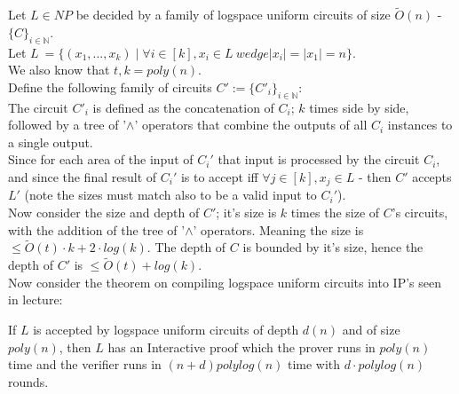 Let $L\in NP$ be decided by a family of logspace uniform circuits
of size $\tilde{O}(n)$ - $\{C\}_{i\in\mathbb{N}}$.\\
Let $L\:=\{(x_1,...,x_k)\mid \forall i\in[k], x_i\in L\ wedge |x_i|=|x_1|=n\}$.\\
We also know that $t,k=poly(n)$.\\

Define the following family of circuits $C':=\{C'_i\}_{i\in\mathbb{N}}$:\\
The circuit $C'_i$ is defined as the concatenation
of $C_i$; $k$ times side by side, followed by
a tree of '$\wedge$' operators that combine
the outputs of all $C_i$ instances to a single output.\\

Since for each area of the input of $C_i'$
that input is processed by the circuit $C_i$,
and since the final result of $C_i'$ is to accept
iff $\forall j\in[k], x_j\in L$ - then $C'$
accepts $L'$ (note the sizes must match
also to be a valid input to $C_i'$).\\

Now consider the size and depth of $C'$;
it's size is $k$ times the size
of $C$'s circuits,
with the addition of the tree of '$\wedge$' operators.
Meaning the size is $\leq\tilde{O}(t)\cdot k+2\cdot log(k)$.
The depth of $C$ is bounded by it's size, hence
the depth of $C'$ is $\leq \tilde{O}(t)+log(k)$.\\

Now consider the theorem on compiling logspace uniform
circuits into IP's seen in lecture:\\
\begin{theorem}
	If $L$ is accepted by logspace uniform circuits of depth $d(n)$ and of size $poly(n)$,
	then $L$ has an Interactive proof which the prover runs in $poly(n)$
	time and the verifier runs in $(n+d)polylog(n)$ time with $d\cdot polylog(n)$ rounds.
\end{theorem}

